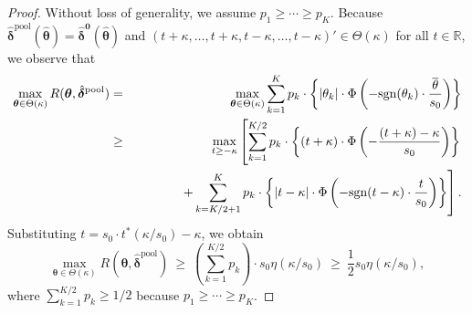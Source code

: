 \documentclass[12pt,a4paper]{article}
\begin{document}
\begin{proof}
Without loss of generality, we assume $p_1 \geq \cdots \geq p_K$. Because $\hat{\bm{\delta}}^{\mathrm{pool}}(\hat{\bm{\theta}}) = \hat{\bm{\delta}}^{\bm{0}}(\hat{\bm{\theta}})$ and $(t+\kappa, \ldots, t+\kappa, t-\kappa, \ldots, t-\kappa)' \in \Theta(\kappa)$ for all $t \in \mathbb{R}$, we observe that
\begin{eqnarray*}
\max_{\bm{\theta} \in \Theta(\kappa)} R(\bm{\theta},\hat{\bm{\delta}}^{\mathrm{pool}}) &=& \max_{\bm{\theta} \in \Theta(\kappa)} \sum_{k=1}^K p_k \cdot \left\{ |\theta_k| \cdot \Phi \left( - \text{sgn}(\theta_k) \cdot \frac{\overline{\theta}}{s_0} \right) \right\} \\
& \geq & \max_{t \geq -\kappa} \left[ \sum_{k=1}^{K/2} p_k \cdot \left\{ (t+\kappa) \cdot \Phi \left( - \frac{(t+\kappa)-\kappa}{s_0} \right) \right\} \right. \\
& & \hspace{0.5in} \left. + \sum_{k=K/2 + 1}^{K} p_k \cdot \left\{ |t-\kappa| \cdot \Phi \left( - \text{sgn}(t-\kappa) \cdot \frac{t}{s_0} \right) \right\} \right].
\end{eqnarray*}
Substituting $t = s_0 \cdot t^{\ast}(\kappa / s_0) - \kappa$, we obtain
\begin{equation}
\max_{\bm{\theta} \in \Theta(\kappa)} R(\bm{\theta},\hat{\bm{\delta}}^{\mathrm{pool}}) \ \geq \ \left( \sum_{k=1}^{K/2} p_k \right) \cdot s_0 \eta \left( \kappa / s_0 \right) \ \geq \ \frac{1}{2} s_0 \eta \left( \kappa / s_0 \right), \label{pool_lower1}
\end{equation}
where $\sum_{k=1}^{K/2} p_k \geq 1/2$ because $p_1 \geq \cdots \geq p_K$.


\end{proof}
\end{document}

